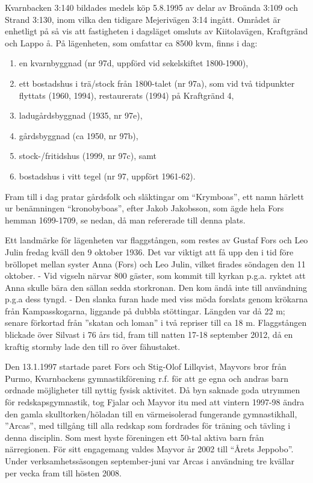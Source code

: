 Kvarnbacken 3:140 bildades medels köp 5.8.1995 av delar av Broända 3:109 och Strand 3:130, inom vilka den tidigare Mejerivägen 3:14 ingått. Området är enhetligt på så vis att fastigheten i dagsläget omsluts av Kiitolavägen, Kraftgränd och Lappo å. På lägenheten, som omfattar ca 8500 kvm, finns i dag:
\begin{enumerate}
  \item en kvarnbyggnad (nr 97d, uppförd vid sekelskiftet 1800-1900),
  \item ett bostadshus i trä/stock från 1800-talet (nr 97a), som vid två tidpunkter flyttats (1960, 1994), restaurerats (1994) på Kraftgränd 4,
  \item ladugårdsbyggnad (1935, nr 97e),
  \item gårdsbyggnad (ca 1950, nr 97b),
  \item stock-/fritidshus (1999, nr 97c), samt
  \item bostadshus i vitt tegel (nr 97, uppfört 1961-62).
\end{enumerate}
Fram till i dag pratar gårdsfolk och släktingar om ``Krymboas'', ett namn härlett ur benämningen ``kronobyboas'', efter Jakob Jakobsson, som ägde hela Fors hemman 1699-1709, se nedan, då man refererade till denna plats.

Ett landmärke för lägenheten var flaggstången, som restes av Gustaf Fors och Leo Julin fredag kväll den 9 oktober 1936. Det var viktigt att få upp den i tid före bröllopet mellan syster Anna (Fors) och Leo Julin, vilket firades söndagen den 11 oktober. - Vid vigseln närvar 800 gäster, som kommit till kyrkan p.g.a. ryktet att Anna skulle bära den sällan sedda storkronan. Den kom ändå inte till användning p.g.a dess tyngd. - Den slanka furan hade med viss möda forslats genom krökarna från Kampasskogarna, liggande på dubbla stöttingar. Längden var då 22 m; senare förkortad från ”skatan och loman” i två repriser till ca 18 m. Flaggstången blickade över Silvast i 76 års tid, fram till natten 17-18 september 2012, då en kraftig stormby lade den till ro över fähustaket.

Den 13.1.1997 startade paret Fors och Stig-Olof Lillqvist, Mayvors bror från Purmo, Kvarnbackens gymnastikförening r.f. för att ge egna och andras barn ordnade möjligheter till nyttig fysisk aktivitet. Då byn saknade goda utrymmen för redskapsgymnastik, tog Fjalar och Mayvor itu med att vintern 1997-98 ändra den gamla skulltorken/höladan till en värmeisolerad fungerande gymnastikhall, ”Arcas”, med tillgång till alla redskap som fordrades för träning och tävling i denna disciplin. Som mest hyste föreningen ett 50-tal aktiva barn från närregionen. För sitt engagemang valdes Mayvor år 2002 till ``Årets Jeppobo''. Under verksamhetssäsongen september-juni var Arcas i användning tre kvällar per vecka fram till hösten 2008.

